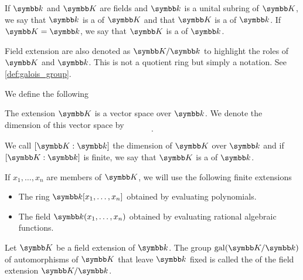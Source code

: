 \begin{definition}\label{def:field_extension}
  If \( \k \) and \( \K \) are fields and \( \k \) is a unital subring of \( \K \), we say that \( \k \) is a  of \( \K \) and that \( \K \) is a  of \( \k \). If \( \K = \k \), we say that \( \K \) is a  of \( \k \).

  Field extension are also denoted as \( \K / \k \) to highlight the roles of \( \K \) and \( \k \). This is not a quotient ring but simply a notation. See \cref{def:galois_group}.

  We define the following
  \begin{defenum}
     The extension \( \K \) is a vector space over \( \k \). We denote the dimension of this vector space by
    \begin{equation*}
      [\K : \k].
    \end{equation*}

    We call \( [\K : \k] \) the dimension of \( \K \) over \( \k \) and if \( [\K : \k] \) is finite, we say that \( \K \) is a  of \( \k \).

     If \( x_1, \ldots, x_n \) are members of \( \K \), we will use the following finite extensions
    \begin{itemize}
      \item The ring \( \k[x_1, \ldots, x_n] \) obtained by evaluating polynomials.
      \item The field \( \k(x_1, \ldots, x_n) \) obtained by evaluating rational algebraic functions.
    \end{itemize}
  \end{defenum}
\end{definition}

\begin{definition}\label{def:galois_group}\cite[124]{Knapp2016BAlg}
  Let \( \K \) be a field extension of \( \k \). The group \( \Gal(\K / \k) \) of automorphisms of \( \K \) that leave \( \k \) fixed is called the  of the field extension \( \K / \k \).
\end{definition}

